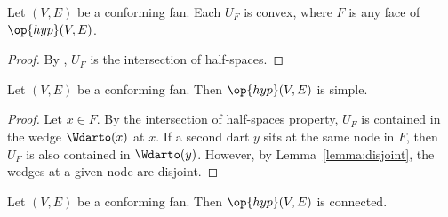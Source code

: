 \begin{lemma}[]
Let $(V,E)$ be a conforming fan.  
Each $U_F$ is convex, where  $F$ is any face of $\op{hyp}(V,E)$.
\end{lemma}
%
%

\begin{proof} By , $U_F$ is the intersection of
half-spaces.
\end{proof}

\begin{lemma}[] \label{lemma:conform-simple} 
Let $(V,E)$ be a conforming fan.  
Then $\op{hyp}(V,E)$ is simple.
\end{lemma}
%

\begin{proof} Let $x\in F$.  By the intersection of half-spaces
property, $U_F$ is contained in the wedge $\Wdarto(x)$ at $x$.  If
 a second dart $y$ sits at the same node in $F$, then $U_F$ is
also contained in $\Wdarto(y)$. However, by
Lemma~\ref{lemma:disjoint}, the wedges at a given node are disjoint.
\end{proof}

\begin{lemma}[]  
Let $(V,E)$ be a conforming fan.  
Then $\op{hyp}(V,E)$ is connected.
\end{lemma}
%
%
%


